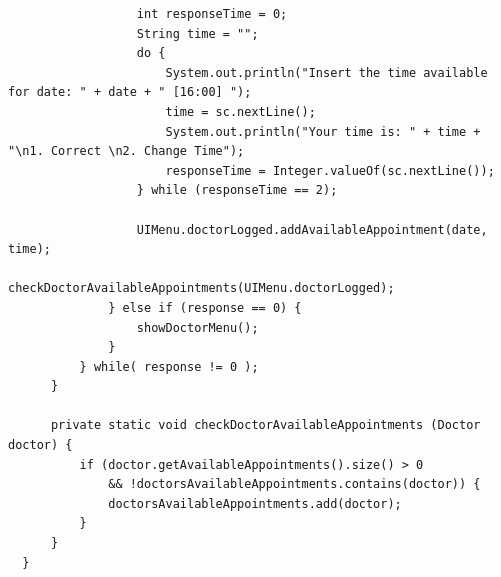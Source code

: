\documentclass{article}
\begin{document}
\begin{verbatim}
                  int responseTime = 0;
                  String time = "";
                  do {
                      System.out.println("Insert the time available for date: " + date + " [16:00] ");
                      time = sc.nextLine();
                      System.out.println("Your time is: " + time + "\n1. Correct \n2. Change Time");
                      responseTime = Integer.valueOf(sc.nextLine());
                  } while (responseTime == 2);

                  UIMenu.doctorLogged.addAvailableAppointment(date, time);
                  checkDoctorAvailableAppointments(UIMenu.doctorLogged);
              } else if (response == 0) {
                  showDoctorMenu();
              }
          } while( response != 0 );
      }

      private static void checkDoctorAvailableAppointments (Doctor doctor) {
          if (doctor.getAvailableAppointments().size() > 0
              && !doctorsAvailableAppointments.contains(doctor)) {
              doctorsAvailableAppointments.add(doctor);
          }
      }
  }
\end{verbatim}
\end{document}
